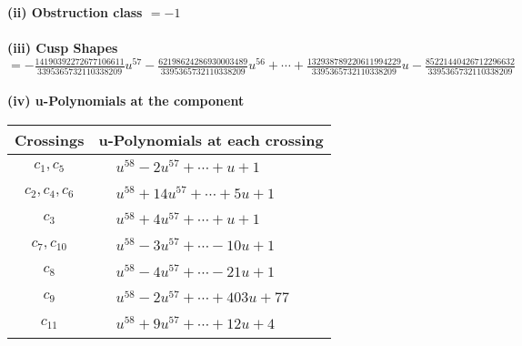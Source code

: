 \documentclass[1p]{elsarticle_modified}
\theoremstyle{definition}
\begin{document}
\flushleft \textbf{(ii) Obstruction class $= -1$}\\~\\
\flushleft \textbf{(iii) Cusp Shapes $= -\frac{14190392272677106611}{3395365732110338209} u^{57}-\frac{62198624286930003489}{3395365732110338209} u^{56}+\cdots+\frac{132938789220611994229}{3395365732110338209} u-\frac{85221440426712296632}{3395365732110338209}$}\\~\\
\newpage\renewcommand{\arraystretch}{1}
\flushleft \textbf{(iv) u-Polynomials at the component}\newline \\
\begin{tabular}{m{50pt}|m{274pt}}
Crossings & \hspace{64pt}u-Polynomials at each crossing \\
\hline $$\begin{aligned}c_{1},c_{5}\end{aligned}$$&$\begin{aligned}
&u^{58}-2 u^{57}+\cdots+u+1
\end{aligned}$\\
\hline $$\begin{aligned}c_{2},c_{4},c_{6}\end{aligned}$$&$\begin{aligned}
&u^{58}+14 u^{57}+\cdots+5 u+1
\end{aligned}$\\
\hline $$\begin{aligned}c_{3}\end{aligned}$$&$\begin{aligned}
&u^{58}+4 u^{57}+\cdots+u+1
\end{aligned}$\\
\hline $$\begin{aligned}c_{7},c_{10}\end{aligned}$$&$\begin{aligned}
&u^{58}-3 u^{57}+\cdots-10 u+1
\end{aligned}$\\
\hline $$\begin{aligned}c_{8}\end{aligned}$$&$\begin{aligned}
&u^{58}-4 u^{57}+\cdots-21 u+1
\end{aligned}$\\
\hline $$\begin{aligned}c_{9}\end{aligned}$$&$\begin{aligned}
&u^{58}-2 u^{57}+\cdots+403 u+77
\end{aligned}$\\
\hline $$\begin{aligned}c_{11}\end{aligned}$$&$\begin{aligned}
&u^{58}+9 u^{57}+\cdots+12 u+4
\end{aligned}$\\
\hline
\end{tabular}\\~\\
\end{document}
